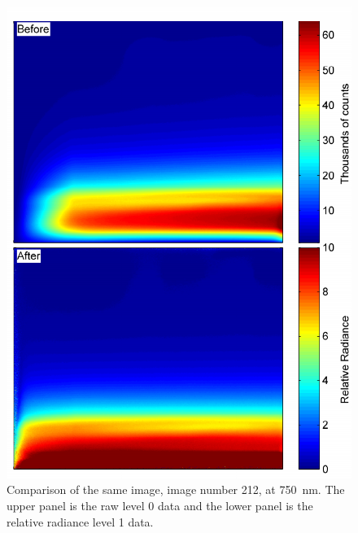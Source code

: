 \begin{figure}
\includegraphics[width=1.0\textwidth]{./Images/5-2-BeforeAfterImage.pdf}
    \caption[Comparison of an Raw and Calibrated ALI Image]{Comparison of the same image, image number 212, at 750~nm. The upper panel is the raw level 0 data and the lower panel is the relative radiance level 1 data.}
    \label{fig:5.2:BeforeAfterImages}
\end{figure}


